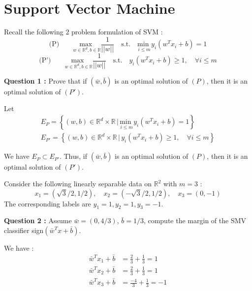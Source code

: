 \documentclass[12pt,a4paper]{article}
\begin{document}
\color{black}


\section{Support Vector Machine}

Recall the following $2$ problem formulation of SVM :
\begin{equation*}
    \text{(P)} \qquad \underset{w \in \mathbb{R}^d, b \in \mathbb{R}}{\text{max }} \frac{1}{||w||} \quad \text{s.t.} \quad \underset{i \leq m}{\text{min }} y_i(w^T x_i + b) = 1
\end{equation*}
\begin{equation*}
    \text{(P')} \qquad \underset{w \in \mathbb{R}^d, b \in \mathbb{R}}{\text{max }} \frac{1}{||w||} \quad \text{s.t.} \quad y_i(w^T x_i + b) \geq 1, \quad \forall i \leq m
\end{equation*}

\noindent\textbf{Question 1 :} Prove that if $(\bar{w}, \bar{b})$ is an optimal solution of $(P)$, then it is an optimal solution of $(P')$.\\


\color{blue}

\noindent Let
\begin{align*}
    E_P = \left\{ (w, b) \in \mathbb{R}^d \times \mathbb{R} \, | \, \underset{i \leq m}{\text{min }} y_i(w^T x_i + b) = 1 \right\} \\
    E_{P'} = \left\{ (w, b) \in \mathbb{R}^d \times \mathbb{R} \, | \, y_i(w^T x_i + b) \geq 1, \quad \forall i \leq m \right\}
\end{align*}

\noindent We have $E_P \subset E_{P'}$. Thus, if $(\bar{w}, \bar{b})$ is an optimal solution of $(P)$, then it is an optimal solution of $(P')$.\\


\color{black}

\noindent Consider the following linearly separable data on $\mathbb{R}^2$ with $m = 3$ :
$$
x_1 = (\sqrt{3}/2, 1/2), \quad x_2 = (-\sqrt{3}/2, 1/2), \quad x_3 = (0, -1)
$$
The corresponding labels are $y_1 = 1, y_2 = 1, y_3 = -1$.

\noindent\textbf{Question 2 :} Assume $\bar{w} = (0, 4/3)$, $\bar{b} = 1/3$, compute the margin of the SMV classifier sign$(\bar{w}^T x + \bar{b})$.\\


\color{blue}

\noindent We have :
\begin{align*}
    \bar{w}^T x_1 + \bar{b} &= \frac{2}{3} + \frac{1}{3} = 1 \\
    \bar{w}^T x_2 + \bar{b} &= \frac{2}{3} + \frac{1}{3} = 1 \\
    \bar{w}^T x_3 + \bar{b} &= \frac{-4}{3} + \frac{1}{3} = -1 \\
\end{align*}
\end{document}
